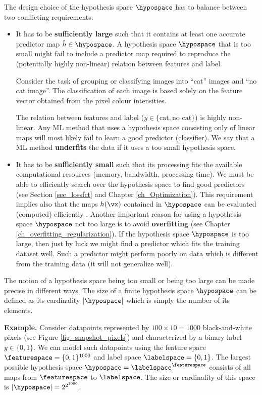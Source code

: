 \documentclass[12pt]{report}
\begin{document}
The design choice of the hypothesis space $\hypospace$ 
has to balance between two conflicting requirements.  
\begin{itemize} 
\item It has to be {\bf sufficiently large} such that it contains at least 
one accurate predictor map $\hat{h} \in \hypospace$. A hypothesis 
space $\hypospace$ that is too small might fail to include a predictor 
map required to reproduce the (potentially highly non-linear) relation 
between features and label. 

Consider the task of grouping or classifying images into 
``cat'' images and ``no cat image''. The classification of 
each image is based solely on the feature vector obtained 
from the pixel colour intensities. 

The relation between features and label ($y \in \{ \mbox{cat}, \mbox{no cat} \}$) 
is highly non-linear. Any ML method that uses a hypothesis space 
consisting only of linear maps will most likely fail to 
learn a good predictor (classifier). We say that a ML 
method {\bf underfits} the data if it uses a too small 
hypothesis space. 
\item It has to be {\bf sufficiently small} such that its processing fits the 
available computational resources (memory, bandwidth, processing time). 
We must be able to efficiently search over the hypothesis space to find 
good predictors (see Section \ref{sec_lossfct} and Chapter \ref{ch_Optimization}). 
This requirement implies also that the maps $h(\vx)$ contained in $\hypospace$ 
can be evaluated (computed) efficiently \cite{Austin2018}. Another important 
reason for using a hypothesis space $\hypospace$ not too large is to 
avoid {\bf overfitting} (see Chapter \ref{ch_overfitting_regularization}). 
If the hypothesis space $\hypospace$ is too large, then just by luck we 
might find a predictor which fits the training dataset well. Such a predictor 
might perform poorly on data which is different from the training data 
(it will not generalize well). 
\end{itemize}

The notion of a hypothesis space being too small or being 
too large can be made precise in different ways. The size of 
a finite hypothesis space $\hypospace$ can be defined as 
its cardinality $|\hypospace|$ which is simply the number of 
its elements. 

{\bf Example.} Consider datapoints represented by $100 \times 10\!=\!1000$ 
black-and-white pixels (see Figure \ref{fig_snapshot_pixels}) and 
characterized by a binary label $y \in \{0,1\}$. We can model such 
datapoints using the feature space $\featurespace = \{0,1\}^{1000}$ 
and label space $\labelspace = \{0,1\}$. The largest possible hypothesis 
space $\hypospace = \labelspace^\featurespace$ consists of all 
maps from $\featurespace$ to $\labelspace$. The size or cardinality 
of this space is $|\hypospace| = 2^{2^{1000}}$.
\end{document}
